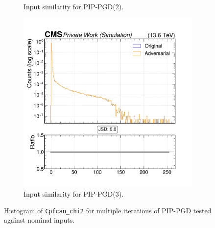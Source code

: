 \begin{figure}[htbp]
\begin{subfigure}[t]{0.32\textwidth}
    \caption*{Input similarity for PIP-PGD(2).}
  \end{subfigure}\hfill
  \begin{subfigure}[t]{0.32\textwidth}
    \includegraphics[width=\linewidth]{media/output/features/compare/combined_it_3/cmp_cpf_arr_Cpfcan_chi2.pdf}
    \caption*{Input similarity for PIP-PGD(3).}
  \end{subfigure}

  \caption*{Histogram of \texttt{Cpfcan\_chi2} for multiple iterations of PIP-PGD tested against nominal inputs.}
  \label{fig:combined_input_Cpfcan_chi2}
\end{figure}

